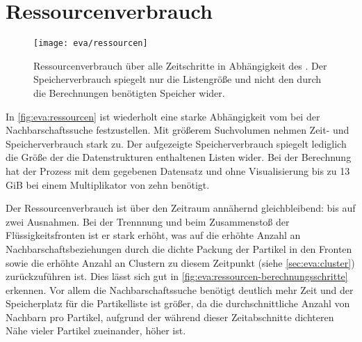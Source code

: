 

\section{Ressourcenverbrauch}\label{sec:eva:ressourcen}
\begin{figure}
	\texttt{[image: eva/ressourcen]}
	\caption{Ressourcenverbrauch über alle Zeitschritte in Abhängigkeit des . Der Speicherverbrauch spiegelt nur die Listengröße und nicht den durch die Berechnungen benötigten Speicher wider.}\label{fig:eva:ressourcen}
\end{figure}

In \autoref{fig:eva:ressourcen} ist wiederholt eine starke Abhängigkeit vom  bei der Nachbarschaftssuche festzustellen. Mit größerem Suchvolumen nehmen Zeit- und Speicherverbrauch stark zu. Der aufgezeigte Speicherverbrauch spiegelt lediglich die Größe der die Datenstrukturen enthaltenen Listen wider. Bei der Berechnung hat der Prozess mit dem gegebenen Datensatz und ohne Visualisierung bis zu 13 \gls{GiB} bei einem Multiplikator von zehn benötigt.

Der Ressourcenverbrauch ist über den Zeitraum annähernd gleichbleibend: bis auf zwei Ausnahmen. Bei der Trennnung und beim Zusammenstoß der Flüssigkeitsfronten ist er stark erhöht, was auf die erhöhte Anzahl an Nachbarschaftsbeziehungen durch die dichte Packung der Partikel in den Fronten sowie die erhöhte Anzahl an Clustern zu diesem Zeitpunkt (siehe \autoref{sec:eva:cluster}) zurückzuführen ist. Dies lässt sich gut in \autoref{fig:eva:ressourcen-berechnungsschritte} erkennen. Vor allem die Nachbarschaftssuche benötigt deutlich mehr Zeit und der Speicherplatz für die Partikelliste ist größer, da die durchschnittliche Anzahl von Nachbarn pro Partikel, aufgrund der während dieser Zeitabschnitte dichteren Nähe vieler Partikel zueinander, höher ist.

